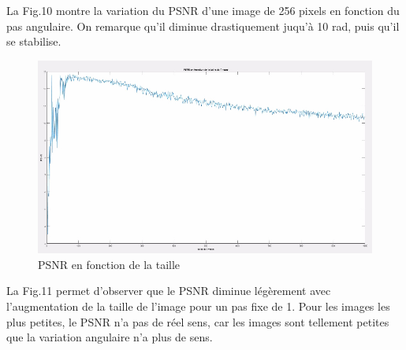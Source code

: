 \documentclass[conference]{IEEEtran}
\begin{document}
La Fig.10 montre la variation du PSNR d'une image de 256 pixels en fonction du pas angulaire. On remarque qu'il diminue drastiquement juqu'à 10 rad, puis qu'il se stabilise.

\begin{figure}[H]
\centering
\includegraphics[scale=0.3]{PSNR3}
	\caption[PSNR en fonction de la taille]{PSNR en fonction de la taille}
\label{fig:gallery}
\end{figure}

La Fig.11 permet d'observer que le PSNR diminue légèrement avec l'augmentation de la taille de l'image pour un pas fixe de 1. Pour les images les plus petites, le PSNR n'a pas de réel sens, car les images sont tellement petites que la variation angulaire n'a plus de sens.
\end{document}
